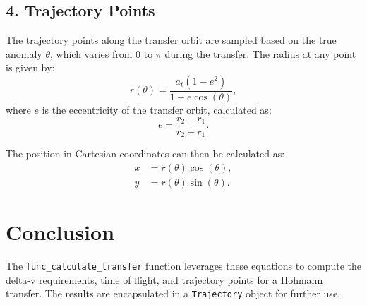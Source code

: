 \documentclass[a4paper,12pt]{article}
\begin{document}
\subsection*{4. Trajectory Points}
The trajectory points along the transfer orbit are sampled based on the true anomaly $\theta$, which varies from $0$ to $\pi$ during the transfer. The radius at any point is given by:
\begin{equation}
    r(\theta) = \frac{a_t(1 - e^2)}{1 + e \cos(\theta)},
\end{equation}
where $e$ is the eccentricity of the transfer orbit, calculated as:
\begin{equation}
    e = \frac{r_2 - r_1}{r_2 + r_1}.
\end{equation}

The position in Cartesian coordinates can then be calculated as:
\begin{align}
    x &= r(\theta) \cos(\theta), \\
    y &= r(\theta) \sin(\theta).
\end{align}

\section*{Conclusion}
The \texttt{func\_calculate\_transfer} function leverages these equations to compute the delta-v requirements, time of flight, and trajectory points for a Hohmann transfer. The results are encapsulated in a \texttt{Trajectory} object for further use.
\end{document}

